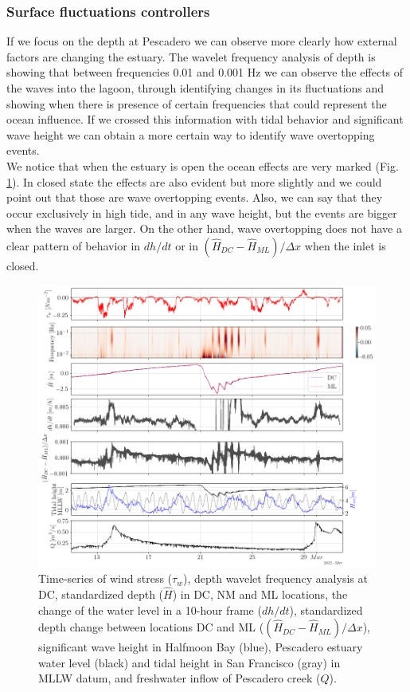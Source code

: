 \documentclass[tesis.tex]{subfiles}
\begin{document}
\subsubsection{Surface fluctuations controllers}

If we focus on the depth at Pescadero we can observe more clearly how external factors are changing the estuary. The wavelet frequency analysis of depth is showing that between frequencies 0.01 and 0.001 Hz we can observe the effects of the waves into the lagoon, through identifying changes in its fluctuations and showing when there is presence of certain frequencies that could represent the ocean influence. If we crossed this information with tidal behavior and significant wave height we can obtain a more certain way to identify wave overtopping events. \\

We notice that when the estuary is open the ocean effects are very marked (Fig. \ref{fig:surf}). In closed state the effects are also evident but more slightly and we could point out that those are wave overtopping events. Also, we can say that they occur exclusively in high tide, and in any wave height, but the events are bigger when the waves are larger. On the other hand, wave overtopping does not have a clear pattern of behavior in $dh/dt$ or in $(\hat{H}_{DC}-\hat{H}_{ML})/\Delta x$ when the inlet is closed.\\

\begin{figure}[h!]
    \centering
    \includegraphics[width=\textwidth]{Imagenes/surf.png}
    \caption{Time-series of wind stress ($\tau_w$), depth wavelet frequency analysis at DC, standardized depth ($\hat{H}$) in DC, NM and ML locations, the change of the water level in a 10-hour frame ($dh/dt$), standardized depth change between locations DC and ML ($(\hat{H}_{DC}-\hat{H}_{ML})/\Delta x$), significant wave height in Halfmoon Bay (blue), Pescadero estuary water level (black) and tidal height in San Francisco (gray) in MLLW datum, and freshwater inflow of Pescadero creek ($Q$).}
    \label{fig:surf}
\end{figure}
\end{document}
